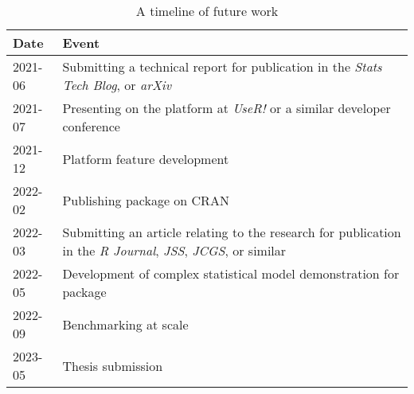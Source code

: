 \begin{table}[h]
        \centering
        \begin{tabularx}{\textwidth}{lX}
                \toprule
                Date & Event\\
                \midrule
		2021-06 & Submitting a technical report for publication in the \textit{Stats Tech Blog}, or \textit{arXiv}\\
		2021-07 & Presenting on the platform at \textit{UseR!} or a similar developer conference\\
                2021-12 & Platform feature development\\
                2022-02 & Publishing package on CRAN\\
		2022-03 & Submitting an article relating to the research for publication in the \textit{R Journal}, \textit{JSS}, \textit{JCGS}, or similar\\
                2022-05 & Development of complex statistical model demonstration for package\\
                2022-09 & Benchmarking at scale\\
                2023-05 & Thesis submission\\
                \bottomrule
        \end{tabularx}
        \caption{\label{future-timeline}A timeline of future work}
\end{table}
